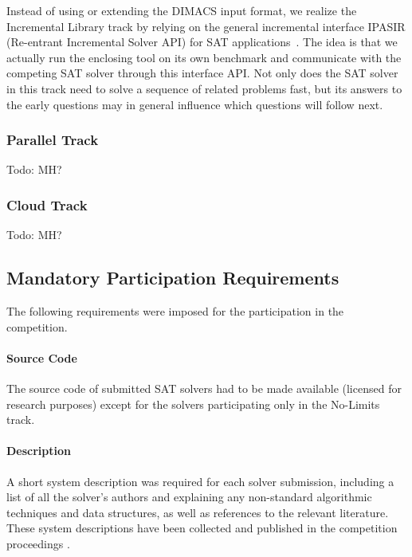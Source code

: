 \documentclass{elsarticle}
\newcommand{\todo}[1]{{\color{purple}Todo: #1}}
\begin{document}
Instead of using or extending the DIMACS input format, we realize the Incremental Library track
by relying on the general incremental interface IPASIR (Re-entrant Incremental Solver API) 
for SAT applications~\cite{Balyo:2015:SATRace}. The idea is that we actually run the 
enclosing tool on its own benchmark and communicate with the competing SAT solver 
through this interface API. Not only does the SAT solver in this track
need to solve a sequence of related problems fast, but its answers to the early questions
may in general influence which questions will follow next.

\subsubsection{Parallel Track}

\todo{MH?}

\subsubsection{Cloud Track}

\todo{MH?}

\subsection{Mandatory Participation Requirements}
\label{sec:rules}

The following requirements were imposed for 
the participation in the competition.

\paragraph{Source Code}
The source code of submitted SAT solvers had to be made available 
(licensed for research purposes) except for the solvers participating only in the No-Limits track.

\paragraph{Description}
A short system description was required for each solver submission,
including a list of all the solver's authors and explaining any non-standard algorithmic
techniques and data structures, as well as references to the relevant literature.
These system descriptions have been collected and published in the competition
proceedings \cite{SC2020}.
\end{document}
